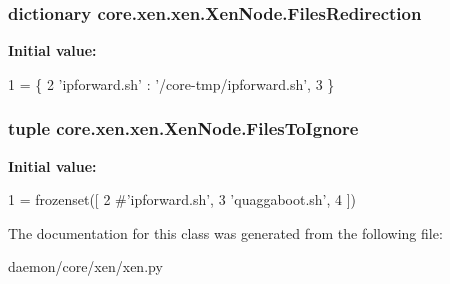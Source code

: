 \hypertarget{classcore_1_1xen_1_1xen_1_1_xen_node_a8ebd74eb013d899672d6e41ecfebd0e8}{
\subsubsection[{Files\+Redirection}]{\setlength{\rightskip}{0pt plus 5cm}dictionary core.\+xen.\+xen.\+Xen\+Node.\+Files\+Redirection\hspace{0.3cm}{\ttfamily [static]}}}\label{classcore_1_1xen_1_1xen_1_1_xen_node_a8ebd74eb013d899672d6e41ecfebd0e8}
{\bfseries Initial value\+:}
\begin{DoxyCode}
1 = \{
2         \textcolor{stringliteral}{'ipforward.sh'} : \textcolor{stringliteral}{'/core-tmp/ipforward.sh'},
3     \}
\end{DoxyCode}
\hypertarget{classcore_1_1xen_1_1xen_1_1_xen_node_ae493a4ff68cd0b8a3579c36937ff014a}{
\subsubsection[{Files\+To\+Ignore}]{\setlength{\rightskip}{0pt plus 5cm}tuple core.\+xen.\+xen.\+Xen\+Node.\+Files\+To\+Ignore\hspace{0.3cm}{\ttfamily [static]}}}\label{classcore_1_1xen_1_1xen_1_1_xen_node_ae493a4ff68cd0b8a3579c36937ff014a}
{\bfseries Initial value\+:}
\begin{DoxyCode}
1 = frozenset([
2         \textcolor{comment}{#'ipforward.sh',}
3         \textcolor{stringliteral}{'quaggaboot.sh'},
4     ])
\end{DoxyCode}


The documentation for this class was generated from the following file\+:\begin{DoxyCompactItemize}
\item 
daemon/core/xen/xen.\+py\end{DoxyCompactItemize}
